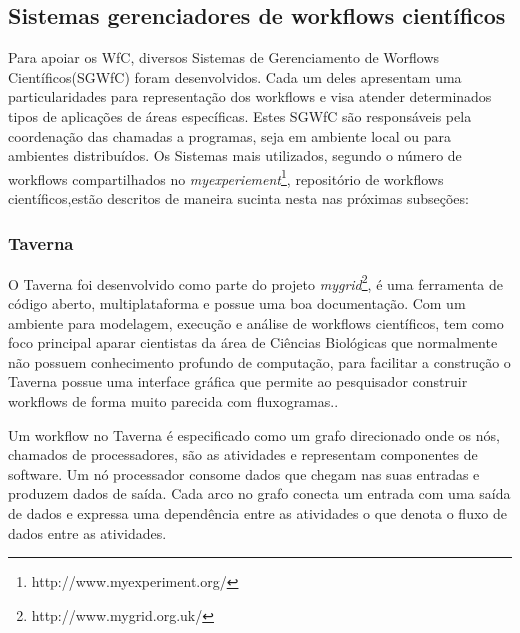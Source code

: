 
	\subsection{Sistemas gerenciadores de workflows científicos}

		Para apoiar os WfC, diversos Sistemas de Gerenciamento de Worflows Científicos(SGWfC) foram desenvolvidos. Cada um deles apresentam uma particularidades para representação dos workflows e visa atender determinados tipos de aplicações de áreas específicas. Estes SGWfC são responsáveis pela coordenação das chamadas a programas, seja em ambiente local ou para ambientes distribuídos\cite{Ogasawara2011}. Os Sistemas mais utilizados, segundo o número de workflows compartilhados no \textit{myexperiement}\footnote{http://www.myexperiment.org/}, repositório de workflows científicos,estão descritos de maneira sucinta nesta nas próximas subseções:
		


		

		\subsubsection{Taverna}

				O Taverna foi desenvolvido como parte do projeto \textit{mygrid}\footnote{http://www.mygrid.org.uk/}, é uma ferramenta de código aberto, multiplataforma e possue uma boa documentação. Com um ambiente para modelagem, execução e análise de workflows científicos, tem como foco principal aparar cientistas da área de Ciências Biológicas que normalmente não possuem conhecimento profundo de computação, para facilitar a construção o Taverna possue uma interface gráfica que permite ao pesquisador construir workflows de forma muito parecida com fluxogramas.\cite{Teixeira2013}.

				Um workflow no Taverna é especificado como um grafo direcionado onde os nós, chamados de processadores,  são as atividades e representam componentes de software. Um nó processador consome dados que chegam nas suas entradas e produzem dados de saída. Cada arco no grafo conecta um entrada com uma saída de dados e expressa uma dependência entre as atividades o que denota o fluxo de dados entre as atividades\cite{Teixeira2013}.
				

